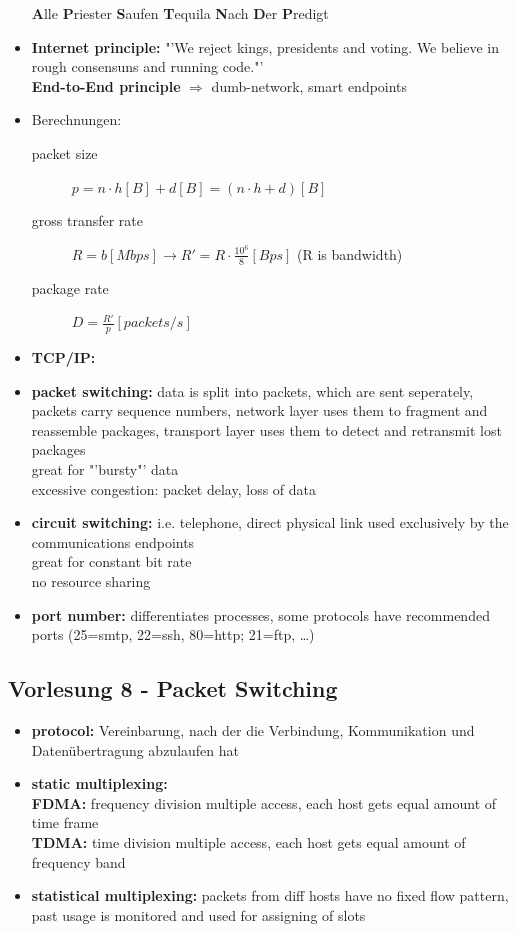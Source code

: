 \begin{itemize}
   \textbf{A}lle \textbf{P}riester \textbf{S}aufen \textbf{T}equila \textbf{N}ach \textbf{D}er \textbf{P}redigt 
  \item \textbf{Internet principle:} "'We reject kings, presidents and voting. We believe in rough consensuns and running code."'\\
  \textbf{End-to-End principle} $\Rightarrow$ dumb-network, smart endpoints
  \item Berechnungen:
   \begin{description}
    \item[packet size] $p=n\cdot h[B]+d[B]=(n\cdot h+d)[B]$
    \item[gross transfer rate] $R=b[Mbps] \to R'=R\cdot \frac{10^6}{8}[Bps]$ (R is bandwidth)
    \item[package rate] $D=\frac{R'}{p}[packets/s]$
   \end{description}
  \item \textbf{TCP/IP:}
  \item \textbf{packet switching:} data is split into packets, which are sent seperately, packets carry sequence numbers, network layer uses them to fragment and reassemble packages, transport layer uses them to detect and retransmit lost packages \\
  great for "'bursty"' data \\
  excessive congestion: packet delay, loss of data
  \item \textbf{circuit switching:} i.e. telephone, direct physical link used exclusively by the communications endpoints\\
  great for constant bit rate \\
  no resource sharing
  \item \textbf{port number:} differentiates processes, some protocols have recommended ports (25=smtp, 22=ssh, 80=http; 21=ftp, \dots)
 \end{itemize}
 
\subsection*{Vorlesung 8 - Packet Switching}
 \begin{itemize}
  \item \textbf{protocol:} Vereinbarung, nach der die Verbindung, Kommunikation und Datenübertragung abzulaufen hat
  \item \textbf{static multiplexing:} \\
   \textbf{FDMA:} frequency division multiple access, each host gets equal amount of time frame \\
   \textbf{TDMA:} time division multiple access, each host gets equal amount of frequency band
  \item \textbf{statistical multiplexing:} packets from diff hosts have no fixed flow pattern, past usage is monitored and used for assigning of slots
 \end{itemize}
 
